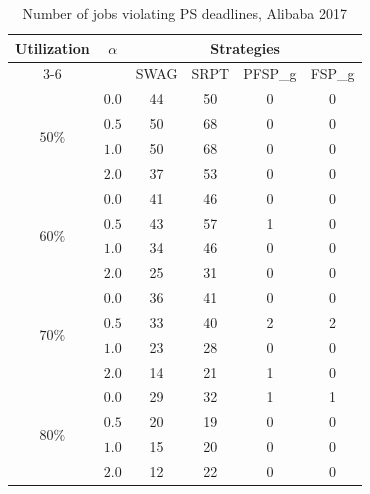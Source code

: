 \begin{table}[htbp]
    \centering
    \caption{Number of jobs violating PS deadlines, Alibaba 2017}
    \label{tab:count_PS_violation_Ali2017}
    \begin{tabular}{cc cccc}
        \toprule
        \multirow{2}{*}{Utilization} & \multirow{2}{*}{$\alpha$} & \multicolumn{4}{c}{Strategies} \\
        \cmidrule(lr){3-6}
        & & SWAG & SRPT & PFSP\_g & FSP\_g \\
        \midrule
        \multirow{4}{*}{$50\%$} 
        & $0.0$ & 44 & 50 & 0 & 0 \\
        & $0.5$ & 50 & 68 & 0 & 0 \\
        & $1.0$ & 50 & 68 & 0 & 0 \\
        & $2.0$ & 37 & 53 & 0 & 0 \\
        \midrule
        \multirow{4}{*}{$60\%$} 
        & $0.0$ & 41 & 46 & 0 & 0 \\
        & $0.5$ & 43 & 57 & 1 & 0 \\
        & $1.0$ & 34 & 46 & 0 & 0 \\
        & $2.0$ & 25 & 31 & 0 & 0 \\
        \midrule
        \multirow{4}{*}{$70\%$} 
        & $0.0$ & 36 & 41 & 0 & 0 \\
        & $0.5$ & 33 & 40 & 2 & 2 \\
        & $1.0$ & 23 & 28 & 0 & 0 \\
        & $2.0$ & 14 & 21 & 1 & 0 \\
        \midrule
        \multirow{4}{*}{$80\%$} 
        & $0.0$ & 29 & 32 & 1 & 1 \\
        & $0.5$ & 20 & 19 & 0 & 0 \\
        & $1.0$ & 15 & 20 & 0 & 0 \\
        & $2.0$ & 12 & 22 & 0 & 0 \\
        \bottomrule
    \end{tabular}
\end{table}

